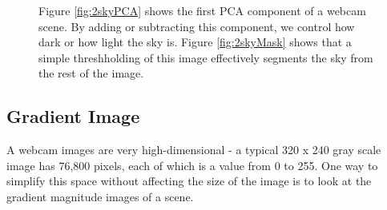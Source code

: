 \begin{figure}
	\centering
		\caption[Learning a sky mask for a webcam scene.]{Figure \ref{fig:2skyPCA} shows the first PCA component of a webcam scene.  By adding or subtracting this component, we control how dark or how light the sky is. Figure \ref{fig:2skyMask} shows that a simple threshholding of this image effectively segments the sky from the rest of the image.}
\end{figure}

\subsection{Gradient Image}

A webcam images are very high-dimensional - a typical 320 x 240 gray scale image has 76,800 pixels, each of
which is a value from 0 to 255.  One way to simplify this space without affecting the size of the image is to
look at the gradient magnitude images of a scene.


